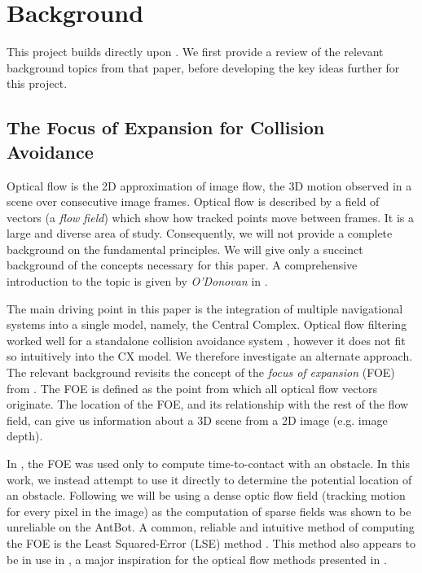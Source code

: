 \documentclass[a4paper,11pt,twoside,openright]{article}
\let\oldsection\section
\def\section{\cleardoublepage\oldsection}
\begin{document}
\section{ Background }
This project builds directly upon \cite{Mitchell2018}. We first provide a review
of the relevant background topics from that paper, before developing the key
ideas further for this project. 

\subsection{ The Focus of Expansion for Collision Avoidance } \label{OFBackground}
Optical flow is the 2D approximation of image flow, the 3D motion
observed in a scene over consecutive image frames. Optical flow is
described by a field of vectors (a \textit{flow field}) which show how
tracked points move between frames. It is a large and
diverse area of study.  Consequently, we will not provide a complete
background on the fundamental principles. We will give only a succinct
background of the concepts necessary for this paper. A comprehensive
introduction to the topic is given by \textit{O'Donovan} in
\cite{ODonovan2005}.
\newline
\par

The main driving point in this paper is the integration of multiple
navigational systems into a single model, namely, the Central Complex.
Optical flow filtering worked well for a standalone collision
avoidance system \cite{Stewart2010, Mitchell2018}, however it does not
fit so intuitively into the CX model. We therefore investigate an
alternate approach. The relevant background revisits the concept of
the \textit{focus of expansion} (FOE) from \cite{Mitchell2018,
  ODonovan2005}.  The FOE is defined as the point from which all
optical flow vectors originate. The location of the FOE, and its
relationship with the rest of the flow field, can give us information
about a 3D scene from a 2D image (e.g. image depth)\cite{ODonovan2005,
  Souhila2007}.
\newline
\par

In \cite{Mitchell2018}, the FOE was used only to compute
time-to-contact with an obstacle. In this work, we instead attempt to
use it directly to determine the potential location of an
obstacle. Following \cite{Mitchell2018} we will be using a dense optic
flow field (tracking motion for every pixel in the image) as the
computation of sparse fields was shown to be unreliable on the
AntBot. A common, reliable and intuitive method of computing the
FOE is the Least Squared-Error (LSE) method \cite{Tistarelli1991,
  ODonovan2005, Vanderstap2012}. This method also appears to be in use
in \cite{Souhila2007}, a major inspiration for the optical flow
methods presented in \cite{Mitchell2018}.
\end{document}
